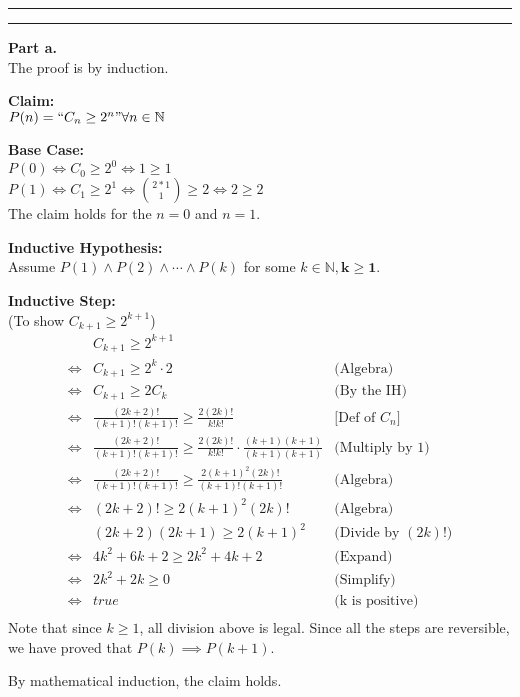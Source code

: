 \documentclass[11pt]{article}
\newcounter{questionCounter}
\newcounter{partCounter}[questionCounter]
\newenvironment{question}[2][\arabic{questionCounter}]{%
    \setcounter{partCounter}{0}%
    \vspace{.25in} \hrule \vspace{0.5em}%
        \noindent{\bf #2}%
    \vspace{0.8em} \hrule \vspace{.10in}%
    \addtocounter{questionCounter}{1}%
}{}
\begin{document}
\begin{question}{Mount Doom}
\textbf{Part a.}\\
The proof is by induction.

\textbf{Claim:}\\
$P(n)=``C_n \geq  2^n" \forall n \in \mathbb{N}$

\textbf{Base Case:}\\
$P(0) \iff C_0 \geq 2^0 \iff 1 \geq 1$\\
$P(1) \iff C_1 \geq 2^1 \iff \binom{2*1}{1} \geq 2 \iff 2 \geq 2$\\
The claim holds for the $n=0$ and $n=1$.

\textbf{Inductive Hypothesis:}\\
Assume $P(1) \wedge P(2) \wedge \cdots \wedge P(k)$ for some $k \in \mathbb{N},\mathbf{k\geq 1}$.

\textbf{Inductive Step:}\\
(To show $C_{k+1} \geq 2^{k+1}$)\\
\begin{align*}
       &C_{k+1} \geq 2^{k+1}           &\text{}\\
\iff    &C_{k+1} \geq 2^k \cdot 2       &\text{(Algebra)}\\
\iff    &C_{k+1} \geq 2C_{k}            &\text{(By the IH)}\\
\iff    &\frac{(2k+2)!}{(k+1)!(k+1)!} \geq \frac{2(2k)!}{k!k!} &\text{[Def of $C_n$]}\\
\iff    &\frac{(2k+2)!}{(k+1)!(k+1)!} \geq \frac{2(2k)!}{k!k!} \cdot \frac{(k+1)(k+1)}{(k+1)(k+1)}      &\text{(Multiply by 1)}\\
\iff    &\frac{(2k+2)!}{(k+1)!(k+1)!} \geq \frac{2(k+1)^2(2k)!}{(k+1)!(k+1)!} &\text{(Algebra)}\\
\iff    &(2k+2)! \geq 2(k+1)^2(2k)!     &\text{(Algebra)}\\
        &(2k+2)(2k+1) \geq 2(k+1)^2       &\text{(Divide by $(2k)!$)}\\
\iff    &4k^2 + 6k + 2 \geq 2k^2 + 4k + 2   &\text{(Expand)}\\
\iff    &2k^2 + 2k \geq 0                   &\text{(Simplify)}\\
\iff    &true                           &\text{(k is positive)}\\
\end{align*}
Note that since $k\geq1$, all division above is legal.
Since all the steps are reversible, we have proved that $P(k) \implies P(k+1)$.

By mathematical induction, the claim holds.
\end{question}
\end{document}
